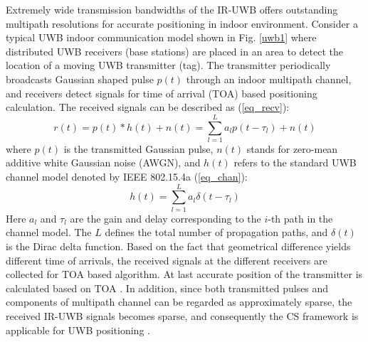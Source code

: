 Extremely wide transmission bandwidths of the IR-UWB offers outstanding multipath resolutions for accurate positioning in indoor environment. Consider a typical UWB indoor communication model shown in Fig. \ref{uwb1} where distributed UWB receivers (base stations) are placed in an area to detect the location of a moving UWB transmitter (tag). The transmitter periodically broadcasts Gaussian shaped pulse $p(t)$ through an indoor multipath channel, and receivers detect signals for time of arrival (TOA) based positioning calculation. The received signals can be described as (\ref{eq_recv}):
\begin{equation}
\label{eq_recv}
r(t) = p(t) * h(t) + n(t) = \sum_{l=1}^{L} a_l p(t-\tau_l) + n(t) 
\end{equation}
where $p(t)$ is the transmitted Gaussian pulse, $n(t)$ stands for zero-mean additive white Gaussian noise (AWGN), and $h(t)$ refers to the standard UWB channel model denoted by IEEE 802.15.4a (\ref{eq_chan}):
\begin{equation}
\label{eq_chan}
h(t) = \sum_{l=1}^{L} a_l \delta(t-\tau_l)
\end{equation}
Here $a_l$ and $\tau_l$ are the gain and delay corresponding to the $i$-th path in the channel model. The $L$ defines the total number of propagation paths, and $\delta(t)$ is the Dirac delta function. Based on the fact that geometrical difference yields different time of arrivals, the received signals at the different receivers are collected for TOA based algorithm. At last accurate position of the transmitter is calculated based on TOA \cite{d2010toa}. In addition, since both transmitted pulses and components of multipath channel can be regarded as approximately sparse, the received IR-UWB signals becomes sparse, and consequently the CS framework is applicable for UWB positioning \cite{yang2011compressive}. 

